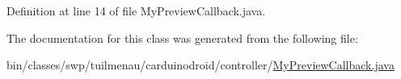 Definition at line 14 of file My\+Preview\+Callback.\+java.



The documentation for this class was generated from the following file\+:\begin{DoxyCompactItemize}
\item 
bin/classes/swp/tuilmenau/carduinodroid/controller/\hyperlink{bin_2classes_2swp_2tuilmenau_2carduinodroid_2controller_2_my_preview_callback_8java}{My\+Preview\+Callback.\+java}\end{DoxyCompactItemize}
